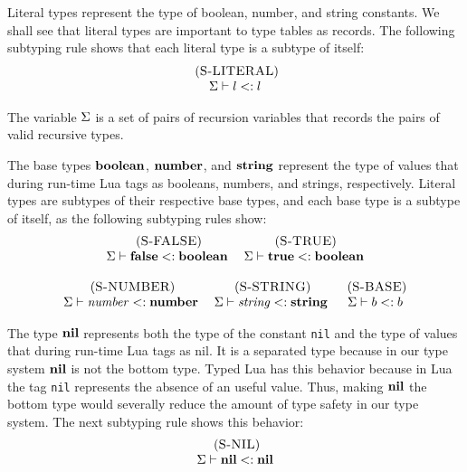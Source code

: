 Literal types represent the type of boolean, number, and string
constants.
We shall see that literal types are important to type tables as
records.
The following subtyping rule shows that each literal type
is a subtype of itself:
\[
\begin{array}{c}
\; (\textsc{S-LITERAL})\\
\Sigma \vdash l <: l
\end{array}
\]

The variable $\Sigma$ is a set of pairs of recursion variables that
records the pairs of valid recursive types.

The base types $\mathbf{boolean}$, $\mathbf{number}$, and $\mathbf{string}$ represent the
type of values that during run-time Lua tags as booleans, numbers,
and strings, respectively.
Literal types are subtypes of their respective base types, and
each base type is a subtype of itself, as the following subtyping
rules show:
\[
\begin{array}{c}
\begin{array}{c}
\; (\textsc{S-FALSE})\\
\Sigma \vdash \mathbf{false} <: \mathbf{boolean}
\end{array}
\;
\begin{array}{c}
\; (\textsc{S-TRUE})\\
\Sigma \vdash \mathbf{true} <: \mathbf{boolean}
\end{array}
\\ \\
\begin{array}{c}
\; (\textsc{S-NUMBER})\\
\Sigma \vdash {\it number} <: \mathbf{number}
\end{array}
\;
\begin{array}{c}
\; (\textsc{S-STRING})\\
\Sigma \vdash {\it string} <: \mathbf{string}
\end{array}
\;
\begin{array}{c}
\; (\textsc{S-BASE})\\
\Sigma \vdash b <: b
\end{array}
\end{array}
\]

The type $\mathbf{nil}$ represents both the type of the constant \texttt{nil}
and the type of values that during run-time Lua tags as nil.
It is a separated type because in our type system $\mathbf{nil}$ is
not the bottom type.
Typed Lua has this behavior because in Lua the tag \texttt{nil}
represents the absence of an useful value.
Thus, making $\mathbf{nil}$ the bottom type would severally reduce the
amount of type safety in our type system.
The next subtyping rule shows this behavior:
\[
\begin{array}{c}
\; (\textsc{S-NIL})\\
\Sigma \vdash \mathbf{nil} <: \mathbf{nil}
\end{array}
\]

